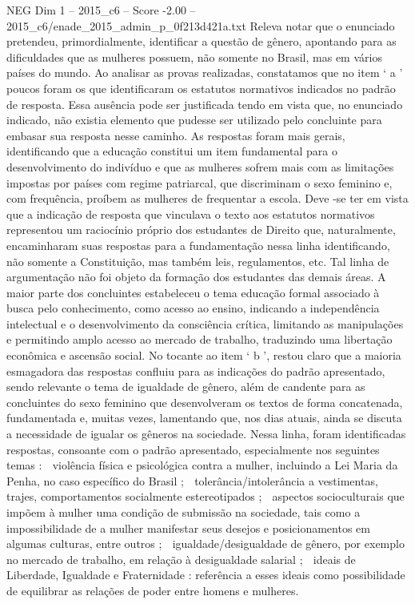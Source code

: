 \begin{textsample}{NEG Dim 1 – 2015\_c6 – Score -2.00 – 2015\_c6/enade\_2015\_admin\_p\_0f213d421a.txt}
Releva notar que o enunciado pretendeu, primordialmente, identificar a questão de gênero, apontando para as dificuldades que as mulheres possuem, não somente no Brasil, mas em vários países do mundo.
Ao analisar as provas realizadas, constatamos que no item ‘ a ’ poucos foram os que identificaram os estatutos normativos indicados no padrão de resposta.
Essa ausência pode ser justificada tendo em vista que, no enunciado indicado, não existia elemento que pudesse ser utilizado pelo concluinte para embasar sua resposta nesse caminho.
As respostas foram mais gerais, identificando que a educação constitui um item fundamental para o desenvolvimento do indivíduo e que as mulheres sofrem mais com as limitações impostas por países com regime patriarcal, que discriminam o sexo feminino e, com frequência, proíbem as mulheres de frequentar a escola.
Deve -se ter em vista que a indicação de resposta que vinculava o texto aos estatutos normativos representou um raciocínio próprio dos estudantes de Direito que, naturalmente, encaminharam suas respostas para a fundamentação nessa linha identificando, não somente a Constituição, mas também leis, regulamentos, etc.
Tal linha de argumentação não foi objeto da formação dos estudantes das demais áreas.
A maior parte dos concluintes estabeleceu o tema educação formal associado à busca pelo conhecimento, como acesso ao ensino, indicando a independência intelectual e o desenvolvimento da consciência crítica, limitando as manipulações e permitindo amplo acesso ao mercado de trabalho, traduzindo uma libertação econômica e ascensão social.
No tocante ao item ‘ b ’, restou claro que a maioria esmagadora das respostas confluiu para as indicações do padrão apresentado, sendo relevante o tema de igualdade de gênero, além de candente para as concluintes do sexo feminino que desenvolveram os textos de forma concatenada, fundamentada e, muitas vezes, lamentando que, nos dias atuais, ainda se discuta a necessidade de igualar os gêneros na sociedade.
Nessa linha, foram identificadas respostas, consoante com o padrão apresentado, especialmente nos seguintes temas :  violência física e psicológica contra a mulher, incluindo a Lei Maria da Penha, no caso específico do Brasil ;  tolerância/intolerância a vestimentas, trajes, comportamentos socialmente estereotipados ;  aspectos socioculturais que impõem à mulher uma condição de submissão na sociedade, tais como a impossibilidade de a mulher manifestar seus desejos e posicionamentos em algumas culturas, entre outros ;  igualdade/desigualdade de gênero, por exemplo no mercado de trabalho, em relação à desigualdade salarial ;  ideais de Liberdade, Igualdade e Fraternidade : referência a esses ideais como possibilidade de equilibrar as relações de poder entre homens e mulheres.

\end{textsample}
